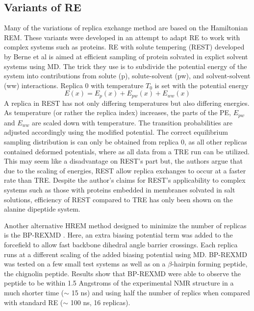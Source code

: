 \documentclass[12pt]{article}
\numberwithin{equation}{subsection}
\begin{document}
\begin{spacing}{1}
\subsection{Variants of RE}
Many of the variations of replica exchange method are based on the Hamiltonian REM. These variants were developed in an attempt to adapt RE to work with complex systems such as proteins. RE with solute tempering (REST) developed by Berne et al \cite{rest} is aimed at efficient sampling of protein solvated in explict solvent systems using MD.  The trick they use is to subdivide the potential energy of the system into contributions from solute (p), solute-solvent (pw), and solvent-solvent (ww) interactions.  Replica $0$ with temperature $T_0$ is set with the potential energy
\begin{equation}
E(x) = E_p(x) + E_{pw}(x) + E_{ww}(x)
\end{equation}
A replica in REST has not only differing temperatures but also differing energies. As temperature (or rather the replica index) increases, the parts of the PE, $E_{pw}$ and $E_{ww}$ are scaled down with temperature. The transition probabilities are adjusted accordingly using the modified potential. The correct equilibrium sampling distribution is can only be obtained from replica 0, as all other replicas contained deformed potentials, where as all data from a TRE run can be utilized.  This may seem like a disadvantage on REST's part but, the authors argue that due to the scaling of energies, REST allow replica exchanges to occur at a faster rate than TRE.  Despite the author's claims for REST's applicability to complex systems such as those with proteins embedded in membranes solvated in salt solutions, efficiency of REST compared to TRE has only been shown on the alanine dipeptide system. 

Another alternative HREM method designed to minimize the number of replicas is the BP-REXMD \cite{kannan}.  Here, an extra biasing potential term was added to the forcefield to allow fast backbone dihedral angle barrier crossings.  Each replica runs at a different scaling of the added biasing potential using MD.  BP-REXMD was tested on a few small test systems as well as on a $\beta$-hairpin forming peptide, the chignolin peptide. Results show that BP-REXMD were able to observe the peptide to be within 1.5 Angstroms of the experimental NMR structure in a much shorter time ($\sim$ 15 ns) and using half the number of replics when compared with standard RE ($\sim$ 100 ns, 16 replicas). 


\end{spacing}
\end{document}
